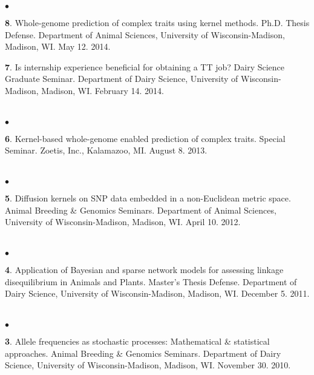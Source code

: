 \documentclass[margin,line,10pt]{res}
\newenvironment{list2}{
  \begin{list}{$\bullet$}{%
      \setlength{\itemsep}{0in}
      \setlength{\parsep}{0in} \setlength{\parskip}{0in}
      \setlength{\topsep}{0in} \setlength{\partopsep}{0in} 
      \setlength{\leftmargin}{0.2in}}}{\end{list}}
\begin{document}
\begin{resume}
\begin{list2}
\item [{\bf 8}.] Whole-genome prediction of complex traits using kernel methods. Ph.D. Thesis Defense. Department of Animal Sciences, University of Wisconsin-Madison, Madison, WI. May 12. 2014.
\vspace{0.5cm}

\item [{\bf 7}.] Is internship experience beneficial for obtaining a TT job? Dairy Science Graduate Seminar. Department of Dairy Science, University of Wisconsin-Madison, Madison, WI. February 14. 2014.
\end{list2}  

\section{}
\begin{list2}
\item  [{\bf 6}.] Kernel-based whole-genome enabled prediction of complex traits. Special Seminar.  Zoetis, Inc., Kalamazoo, MI. August 8. 2013.
\end{list2}  

\section{}
\begin{list2}
 \item [{\bf 5}.] Diffusion kernels on SNP data embedded in a non-Euclidean metric space. Animal Breeding \& Genomics Seminars.  Department of Animal Sciences, University of Wisconsin-Madison, Madison, WI. April 10. 2012. 
\end{list2}  

\section{}
\begin{list2}
\item  [{\bf 4}.] Application of Bayesian and sparse network models for assessing linkage disequilibrium in Animals and Plants. Master's Thesis Defense.  Department of Dairy Science, University of Wisconsin-Madison, Madison, WI. December 5. 2011. 
\end{list2}  

\section{}
\begin{list2}
\item [{\bf 3}.] Allele frequencies as stochastic processes: Mathematical \& statistical approaches. Animal Breeding \& Genomics Seminars.  Department of Dairy Science, University of Wisconsin-Madison, Madison, WI. November 30. 2010.


\end{list2}
\end{resume}
\end{document}
